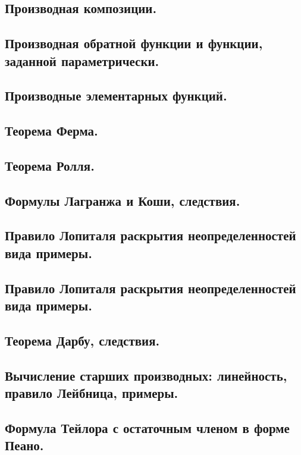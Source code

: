 \documentclass[12pt, a4paper]{article}
\begin{document}
\subsection{Производная композиции.}

\subsection{Производная обратной функции и функции, заданной параметрически.}

\subsection{Производные элементарных функций.}

\subsection{Теорема Ферма.}

\subsection{Теорема Ролля.}

\subsection{Формулы Лагранжа и Коши, следствия.}

\subsection{Правило Лопиталя раскрытия неопределенностей вида примеры.}

\subsection{Правило Лопиталя раскрытия неопределенностей вида примеры.}

\subsection{Теорема Дарбу, следствия.}

\subsection{Вычисление старших производных: линейность, правило Лейбница, примеры.}

\subsection{Формула Тейлора с остаточным членом в форме Пеано.}
\end{document}
